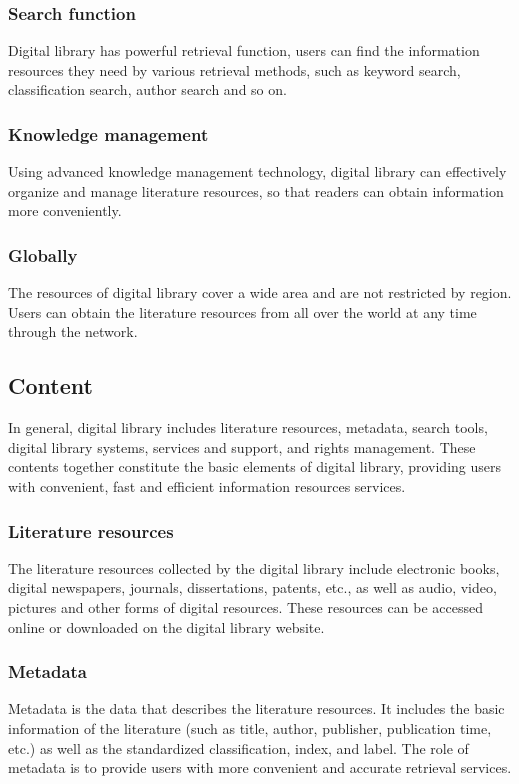 \subsubsection{Search function}
Digital library has powerful retrieval function, users can find the information resources they need by various retrieval methods, such as keyword search, classification search, author search and so on.

\subsubsection{Knowledge management}
Using advanced knowledge management technology, digital library can effectively organize and manage literature resources, so that readers can obtain information more conveniently.

\subsubsection{Globally}
The resources of digital library cover a wide area and are not restricted by region. Users can obtain the literature resources from all over the world at any time through the network.

\subsection{Content}
In general, digital library includes literature resources, metadata, search tools, digital library systems, services and support, and rights management. These contents together constitute the basic elements of digital library, providing users with convenient, fast and efficient information resources services. 
 
\subsubsection{Literature resources}
The literature resources collected by the digital library include electronic books, digital newspapers, journals, dissertations, patents, etc., as well as audio, video, pictures and other forms of digital resources. These resources can be accessed online or downloaded on the digital library website.

\subsubsection{Metadata}
Metadata is the data that describes the literature resources. It includes the basic information of the literature (such as title, author, publisher, publication time, etc.) as well as the standardized classification, index, and label. The role of metadata is to provide users with more convenient and accurate retrieval services.


